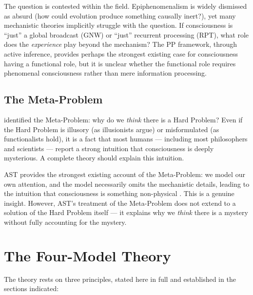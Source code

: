 \documentclass[12pt]{article}
\begin{document}
The question is contested within the field. Epiphenomenalism \citep{Huxley1874,Jackson1982} is widely dismissed as absurd (how could evolution produce something causally inert?), yet many mechanistic theories implicitly struggle with the question. If consciousness is ``just'' a global broadcast (GNW) or ``just'' recurrent processing (RPT), what role does the \emph{experience} play beyond the mechanism? The PP framework, through active inference, provides perhaps the strongest existing case for consciousness having a functional role, but it is unclear whether the functional role requires phenomenal consciousness rather than mere information processing.


\subsection{The Meta-Problem}


\citet{Chalmers2018} identified the Meta-Problem: why do we \emph{think} there is a Hard Problem? Even if the Hard Problem is illusory (as illusionists argue) or misformulated (as functionalists hold), it is a fact that most humans --- including most philosophers and scientists --- report a strong intuition that consciousness is deeply mysterious. A complete theory should explain this intuition.

AST provides the strongest existing account of the Meta-Problem: we model our own attention, and the model necessarily omits the mechanistic details, leading to the intuition that consciousness is something non-physical \citep{Graziano2013}. This is a genuine insight. However, AST's treatment of the Meta-Problem does not extend to a solution of the Hard Problem itself --- it explains why we \emph{think} there is a mystery without fully accounting for the mystery.



\section{The Four-Model Theory}

The theory rests on three principles, stated here in full and established in the sections indicated:
\end{document}
